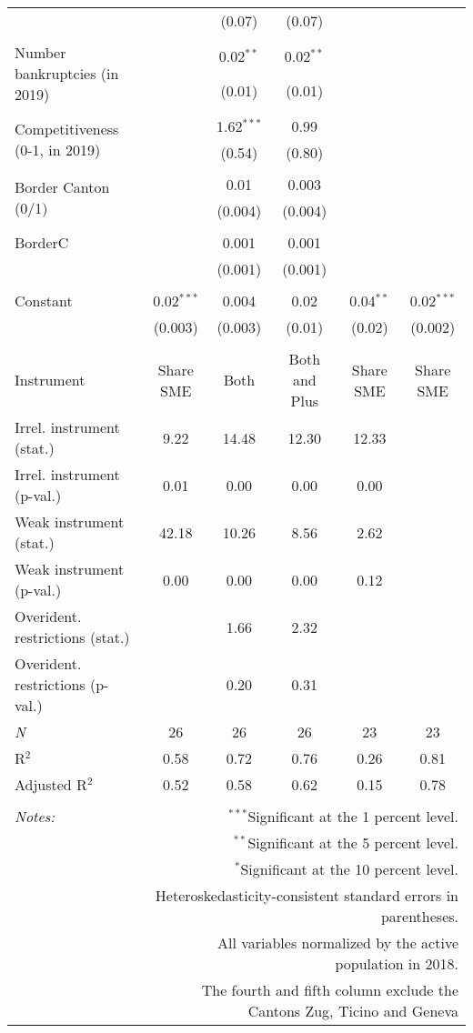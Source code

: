 \begin{table}[!htbp]
\begin{tabular}{@{\extracolsep{5pt}}lccccc}
  &  & (0.07) & (0.07) &  &  \\ 
  & & & & & \\ 
 \multirow{2}{4.5cm}{Number bankruptcies (in 2019)} &  & 0.02$^{**}$ & 0.02$^{**}$ &  &  \\ 
  &  & (0.01) & (0.01) &  &  \\ 
  & & & & & \\ 
 \multirow{2}{4.5cm}{Competitiveness (0-1, in 2019)} &  & 1.62$^{***}$ & 0.99 &  &  \\ 
  &  & (0.54) & (0.80) &  &  \\ 
  & & & & & \\ 
 \multirow{2}{4.5cm}{Border Canton (0/1)} &  & 0.01 & 0.003 &  &  \\ 
  &  & (0.004) & (0.004) &  &  \\ 
  & & & & & \\ 
 BorderC &  & 0.001 & 0.001 &  &  \\ 
  &  & (0.001) & (0.001) &  &  \\ 
  & & & & & \\ 
 Constant & 0.02$^{***}$ & 0.004 & 0.02 & 0.04$^{**}$ & 0.02$^{***}$ \\ 
  & (0.003) & (0.003) & (0.01) & (0.02) & (0.002) \\ 
  & & & & & \\ 
Instrument & Share SME & Both & Both and Plus & Share SME & Share SME \\ 
Irrel. instrument (stat.) &  9.22 & 14.48 & 12.30 & 12.33 &  \\ 
Irrel. instrument (p-val.) & 0.01 & 0.00 & 0.00 & 0.00 &  \\ 
Weak instrument (stat.) & 42.18 & 10.26 &  8.56 &  2.62 &  \\ 
Weak instrument (p-val.) & 0.00 & 0.00 & 0.00 & 0.12 &  \\ 
Overident. restrictions (stat.) &  & 1.66 & 2.32 &  &  \\ 
Overident. restrictions (p-val.) &  & 0.20 & 0.31 &  &  \\ 
\textit{N} & 26 & 26 & 26 & 23 & 23 \\ 
R$^{2}$ & 0.58 & 0.72 & 0.76 & 0.26 & 0.81 \\ 
Adjusted R$^{2}$ & 0.52 & 0.58 & 0.62 & 0.15 & 0.78 \\ 
\hline 
\hline \\[-1.8ex] 
\textit{Notes:} & \multicolumn{5}{r}{$^{***}$Significant at the 1 percent level.} \\ 
 & \multicolumn{5}{r}{$^{**}$Significant at the 5 percent level.} \\ 
 & \multicolumn{5}{r}{$^{*}$Significant at the 10 percent level.} \\ 
 & \multicolumn{5}{r}{Heteroskedasticity-consistent standard errors in parentheses.} \\ 
 & \multicolumn{5}{r}{All variables normalized by the active population in 2018.} \\ 
 & \multicolumn{5}{r}{The fourth and fifth column exclude the Cantons Zug, Ticino and Geneva} \\ 
\end{tabular} 
\end{table} 
